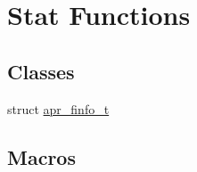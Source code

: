 \hypertarget{group__apr__file__stat}{}\section{Stat Functions}
\label{group__apr__file__stat}
\subsection*{Classes}
\begin{DoxyCompactItemize}
\item 
struct \mbox{\hyperlink{structapr__finfo__t}{apr\+\_\+finfo\+\_\+t}}
\end{DoxyCompactItemize}
\subsection*{Macros}
